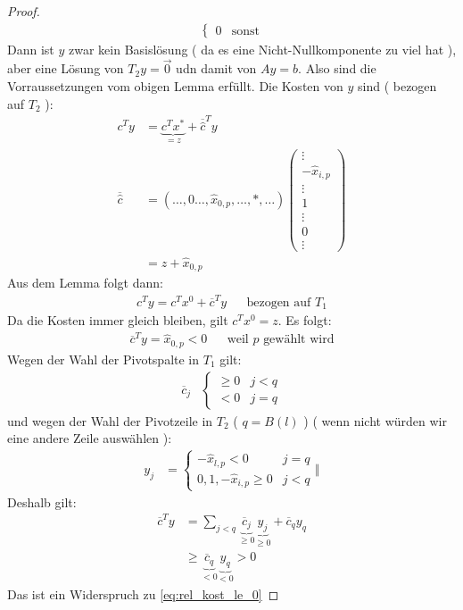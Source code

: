 \begin{proof}
\begin{align*}
\begin{cases}
0 & \text{sonst}
\end{cases}
\end{align*}
Dann ist $y$ zwar kein Basislösung ( da es eine Nicht-Nullkomponente zu viel hat ), aber eine Lösung von $T_2y = \vec{0}$ udn damit von $Ay = b$.
Also sind die Vorraussetzungen vom obigen Lemma erfüllt.
Die Kosten von $y$ sind ( bezogen auf $T_2$ ):
\begin{align*}
c^Ty &= \underbrace{c^Tx^*}_{=z} + \overline{\hat{c}}^T y\\
\overline{\hat{c}} &= (\dotsc, 0 \dotsc, \hat{x}_{0,p}, \dotsc, * , \dotsc) \begin{pmatrix}
\vdots \\
-\hat{x}_{i,p} \\
\vdots \\
1 \\
\vdots \\
0 \\
\vdots
\end{pmatrix} \\
&= z + \hat{x}_{0,p}
\end{align*}
Aus dem Lemma folgt dann:
\begin{align*}
c^Ty = c^Tx^0 + \overline{c}^Ty &&\text{bezogen auf $T_1$}
\end{align*}
Da die Kosten immer gleich bleiben, gilt $c^Tx^0 = z$. Es folgt:
\begin{align}
\overline{c}^Ty = \hat{x}_{0,p} < 0 &&\text{weil $p$ gewählt wird}
\label{eq:rel_kost_le_0}
\end{align}
Wegen der Wahl der Pivotspalte in $T_1$ gilt:
\begin{align*}
\overline{c}_j & \begin{cases}
\geq 0 & j < q \\
< 0 & j = q
\end{cases}
\end{align*}
und wegen der Wahl der Pivotzeile in $T_2$ ( $q=B(l)$ ) ( wenn nicht würden wir eine andere Zeile auswählen ):
\begin{align*}
y_j &= \begin{cases}
-\hat{x}_{l,p} < 0 & j=q \\
0, 1, -\hat{x}_{i,p} \geq 0 & j<q
\end{cases}\Vert
\end{align*}
Deshalb gilt:
\begin{align}
\overline{c}^T y &= \sum_{j < q} \underbrace{\overline{c}_j}_{\geq 0} \underbrace{y_j}_{\geq 0} + \overline{c}_q y_q \nonumber \\
&\geq \underbrace{\overline{c}_q}_{<0} \underbrace{y_q}_{<0} > 0
\end{align}
Das ist ein Widerspruch zu \eqref{eq:rel_kost_le_0}
\end{proof}

